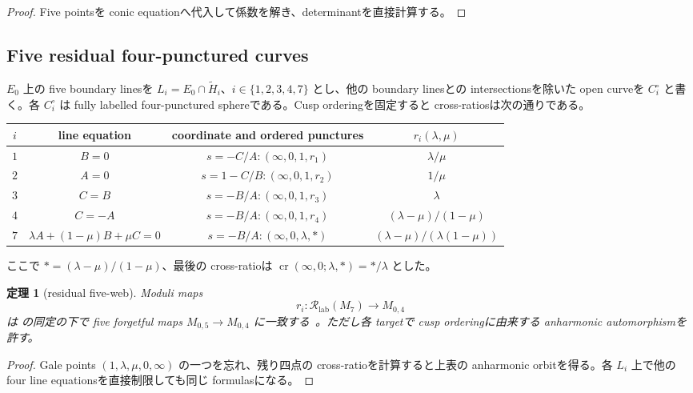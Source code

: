 \documentclass[11pt,a4paper]{ltjsarticle}
\theoremstyle{plain}
\newtheorem{theorem}{定理}[section]\newtheorem{proposition}[theorem]{命題}
\theoremstyle{definition}
\theoremstyle{remark}
\begin{document}
\begin{proof}
Five pointsを conic equationへ代入して係数を解き、determinantを直接計算する。
\end{proof}

\subsection{Five residual four-punctured curves}
$E_0$ 上の five boundary linesを $L_i=E_0\cap\widetilde H_i$、$i\in\{1,2,3,4,7\}$ とし、他の boundary linesとの intersectionsを除いた open curveを $C_i^\circ$ と書く。各 $C_i^\circ$ は fully labelled four-punctured sphereである。Cusp orderingを固定すると cross-ratiosは次の通りである。

\begin{center}
\begin{tabularx}{\textwidth}{@{}c c c c@{}}
\toprule
$i$ & line equation & coordinate and ordered punctures & $r_i(\lambda,\mu)$\\
\midrule
$1$ & $B=0$ & $s=-C/A:(\infty,0,1,r_1)$ & $\lambda/\mu$\\
$2$ & $A=0$ & $s=1-C/B:(\infty,0,1,r_2)$ & $1/\mu$\\
$3$ & $C=B$ & $s=-B/A:(\infty,0,1,r_3)$ & $\lambda$\\
$4$ & $C=-A$ & $s=-B/A:(\infty,0,1,r_4)$ & $(\lambda-\mu)/(1-\mu)$\\
$7$ & $\lambda A+(1-\mu)B+\mu C=0$ & $s=-B/A:(\infty,0,\lambda,*)$ & $(\lambda-\mu)/(\lambda(1-\mu))$\\
\bottomrule
\end{tabularx}
\end{center}
ここで $*=(\lambda-\mu)/(1-\mu)$、最後の cross-ratioは $\operatorname{cr}(\infty,0;\lambda,*)=*/\lambda$ とした。

\begin{theorem}[residual five-web]\label{thm:residual-five-web}
Moduli maps
\[
 r_i:\mathcal R_{\mathrm{lab}}(M_7)\longrightarrow M_{0,4}
\]
は  の同定の下で five forgetful maps $M_{0,5}\to M_{0,4}$ に一致する~\cite{Pirio}。ただし各 targetで cusp orderingに由来する anharmonic automorphismを許す。
\end{theorem}

\begin{proof}
Gale points $(1,\lambda,\mu,0,\infty)$ の一つを忘れ、残り四点の cross-ratioを計算すると上表の anharmonic orbitを得る。各 $L_i$ 上で他の four line equationsを直接制限しても同じ formulasになる。
\end{proof}
\end{document}
